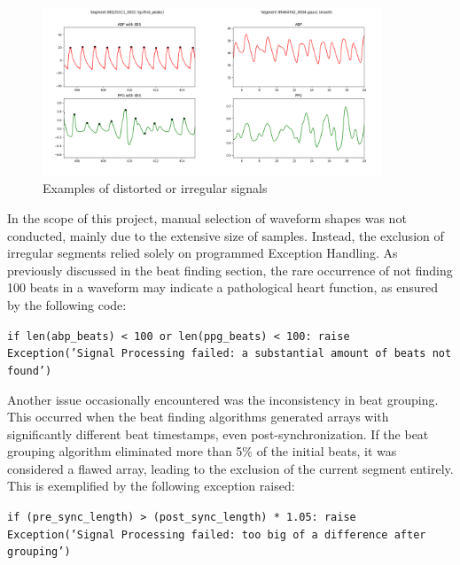 \begin{figure}[h]
    \includegraphics[width=0.9\textwidth]{images/methods/cringe_signals}
    \caption{Examples of distorted or irregular signals}
    \label{fig:distorted}
\end{figure}

In the scope of this project, manual selection of waveform shapes was not conducted, mainly due to the extensive size of samples.
Instead, the exclusion of irregular segments relied solely on programmed Exception Handling.
As previously discussed in the beat finding section, the rare occurrence of not finding 100 beats in a waveform may indicate a pathological heart function, as ensured by the following code:

\vspace{0.1cm}
{\texttt{\small if len(abp\_beats) < 100 or len(ppg\_beats) < 100: \newline
\indent\indent\indent raise Exception('Signal Processing failed: \newline
\indent\indent\indent\indent\indent\indent a substantial amount of beats not found')}}
\vspace{0.1cm}

Another issue occasionally encountered was the inconsistency in beat grouping.
This occurred when the beat finding algorithms generated arrays with significantly different beat timestamps, even post-synchronization.
If the beat grouping algorithm eliminated more than 5\% of the initial beats, it was considered a flawed array, leading to the exclusion of the current segment entirely.
This is exemplified by the following exception raised:

\vspace{0.1cm}
{\texttt{\small if (pre\_sync\_length) > (post\_sync\_length) * 1.05: \newline
\indent\indent\indent raise Exception('Signal Processing failed: \newline
\indent\indent\indent\indent\indent\indent too big of a difference after grouping')}}
\vspace{0.1cm}

